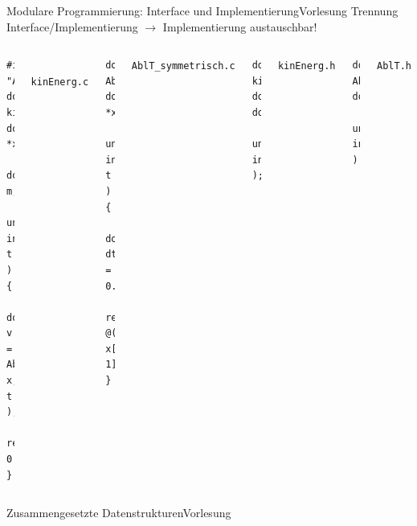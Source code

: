 \documentclass[xcolor=dvipsnames]{beamer}
\newcounter{lecturecounter}
\begin{document}
\begin{frame}[fragile]{Modulare Programmierung: Interface und Implementierung}{Vorlesung }
Trennung Interface/Implementierung $\rightarrow$ Implementierung austauschbar!
\begin{columns}[T]
    \begin{lstlisting}
#include "AblT.h"
double 
kinEnerg( double *x, 
          double m, 
          unsigned int t ) {
  double v = AblT( x, t );
  return 0.5*m*v*v;
}
    \end{lstlisting}
    \\ \texttt{kinEnerg.c}
    \vspace{0.1cm}
    \begin{lstlisting}
double AblT( double *x, 
             unsigned int t ){
  double dt = 0.01;
  return @(x[t+1]-x[t-1])/(2*dt)@;
}
    \end{lstlisting}
    \texttt{AblT\_symmetrisch.c}
    \begin{lstlisting}
double kinEnerg( double*, double,
                 unsigned int );
    \end{lstlisting}
    \texttt{kinEnerg.h}
    \vspace{2.4cm}
    \begin{lstlisting}
double AblT( double*, 
             unsigned int );
    \end{lstlisting}
    \texttt{AblT.h}  
  \end{columns}
\end{frame}

\begin{frame}[fragile]{Zusammengesetzte Datenstrukturen}{Vorlesung }
\end{frame}
\end{document}

